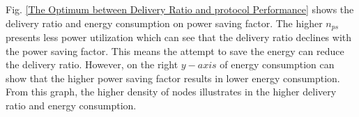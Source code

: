\documentclass[conference]{IEEEtran}
\begin{document}
Fig. \ref{The Optimum between Delivery Ratio and protocol Performance} shows the delivery ratio and energy consumption on power saving factor. 
The higher $n_{ps}$ presents less power utilization which can see that the delivery ratio declines with the power saving factor.
This means the attempt to save the energy can reduce the delivery ratio.
However, on the right $y-axis$ of energy consumption can show that the higher power saving factor results in lower energy consumption.
From this graph, the higher density of nodes illustrates in the higher delivery ratio and energy consumption. 










\end{document}
